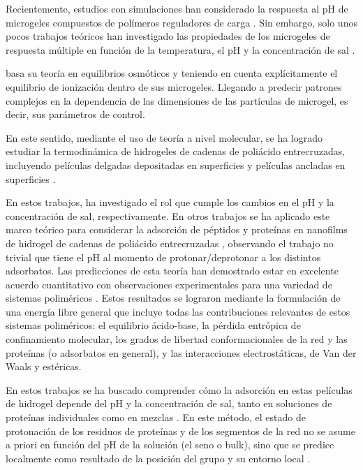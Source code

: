 Recientemente, estudios con simulaciones han considerado la respuesta al pH de microgeles compuestos de pol\'imeros reguladores de carga \cite{Schroeder2015,Rud2017,Sean2018, Hofzumahaus2018,Lu2019}.
Sin embargo, solo unos pocos trabajos te\'oricos han investigado las propiedades de los microgeles de respuesta m\'ultiple en funci\'on de la temperatura, el pH y la concentraci\'on de sal \cite{CaprilesGonzalez2008,polotsky2013collapse}.

\citet{polotsky2013collapse} basa su teor\'ia en equilibrios osm\'oticos y teniendo en cuenta expl\'icitamente el equilibrio de ionizaci\'on dentro de sus microgeles. Llegando a predecir patrones complejos en la dependencia de las dimensiones de las part\'iculas de microgel, es decir, sus par\'ametros de control.

En este sentido, mediante el uso de teor\'ia a nivel molecular, se ha logrado estudiar la termodin\'amica de hidrogeles de cadenas de poli\'acido entrecruzadas, incluyendo pel\'iculas delgadas depositadas en superficies \cite{longo2012molecular,nap2006weak} y pel\'iculas ancladas en superficies \cite{longo2014non}.

En estos trabajos, \citet{longo2014equilibrium} ha investigado el rol que cumple los cambios en el pH y la concentraci\'on de sal, respectivamente. En otros trabajos se ha aplicado este marco te\'orico para considerar la adsorci\'on de p\'eptidos y prote\'inas en nanofilms de hidrogel de cadenas de poli\'acido entrecruzadas \cite{longo2014equilibrium,narambuena2015lysozyme,longo2016adsorption,hagemann2018use,szleifer1997protein,fang2005kinetics}, observando el trabajo no trivial que tiene el pH al momento de protonar/deprotonar a los distintos adsorbatos.
Las predicciones de esta teor\'ia han demostrado estar en excelente acuerdo cuantitativo con observaciones experimentales para una variedad de sistemas polim\'ericos \cite{tagliazucchi2010responsive,wu2007behavior}.
Estos resultados se lograron mediante la formulaci\'on de una energ\'ia libre general que incluye todas las contribuciones relevantes de estos sistemas polim\'ericos: el equilibrio \'acido-base, la p\'erdida entr\'opica de confinamiento molecular, los grados de libertad conformacionales de la red y las prote\'inas (o adsorbatos en general), y las interacciones electrost\'aticas, de Van der Waals y est\'ericas.

En estos trabajos se ha buscado comprender c\'omo la adsorci\'on en estas pel\'iculas de hidrogel depende del pH y la concentraci\'on de sal, tanto en soluciones de prote\'inas individuales como en mezclas \cite{hagemann2018use,tagliazucchi2010responsive,longo2016adsorption}. En este m\'etodo, el estado de protonaci\'on de los residuos de prote\'inas y de los segmentos de la red no se asume a priori en funci\'on del pH de la soluci\'on (el seno o bulk), sino que se predice localmente como resultado de la posici\'on del grupo y su entorno local \cite{longo2019protonation,tagliazucchi2010responsive}.

